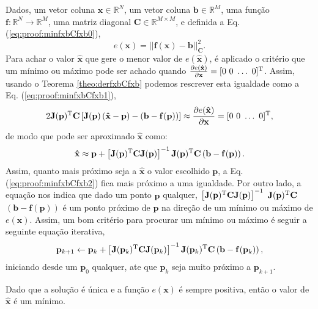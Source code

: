 \begin{myproofT}\label{proof:theo:minfxbCfxb}
Dados,
um vetor coluna $\mathbf{x}\in \mathbb{R}^N$, 
um vetor coluna $\mathbf{b}\in \mathbb{R}^M$,  
uma função $\mathbf{f}:\mathbb{R}^{N} \rightarrow \mathbb{R}^{M}$, 
uma matriz diagonal $\mathbf{C} \in \mathbb{R}^{M\times M}$, e 
definida a Eq. (\ref{eq:proof:minfxbCfxb0}),
\begin{equation}\label{eq:proof:minfxbCfxb0}
e(\mathbf{x})=||\mathbf{f}(\mathbf{x})-\mathbf{b}||_{\mathbf{C}}^2.
\end{equation}
Para achar o valor  $\mathbf{\hat{x}}$ que gere o menor valor de $e(\mathbf{\hat{x}})$, é aplicado
o critério que um mínimo ou máximo pode ser achado quando 
$\frac{\partial e(\mathbf{\hat{x}})}{\partial \mathbf{x} }=[0~ 0~ \hdots~ 0 ]^{\mathrm{T}}$.
Assim, usando o Teorema \ref{theo:derfxbCfxb} podemos 
rescrever esta igualdade como a Eq. (\ref{eq:proof:minfxbCfxb1}),
\begin{equation}\label{eq:proof:minfxbCfxb1}
2 \mathbf{J}(\mathbf{p})^{\mathrm{T}}\mathbf{C}\left[\mathbf{J}(\mathbf{p})\left(\mathbf{\hat{x}} - \mathbf{p}\right)-\left(\mathbf{b}-\mathbf{f}(\mathbf{p})\right)\right] \approx
\frac{\partial e(\mathbf{\hat{x}})}{\partial \mathbf{x} }=[0~ 0~ \hdots~ 0 ]^{\mathrm{T}},
\end{equation}
de modo que pode ser aproximado $\mathbf{\hat{x}}$ como:
\begin{equation}\label{eq:proof:minfxbCfxb2}
\mathbf{\hat{x}} \approx \mathbf{p} +
\left[ \mathbf{J}(\mathbf{p})^{\mathrm{T}}\mathbf{C} \mathbf{J}(\mathbf{p}) \right]^{-1}
\mathbf{J}(\mathbf{p})^{\mathrm{T}}\mathbf{C} \left(\mathbf{b}-\mathbf{f}(\mathbf{p})\right).
\end{equation}
Assim, quanto mais próximo seja a $\mathbf{\hat{x}}$ o valor escolhido $\mathbf{p}$, 
a Eq. (\ref{eq:proof:minfxbCfxb2}) fica mais próximo a uma igualdade. Por outro lado,
a equação nos indica que dado um ponto  $\mathbf{p}$ qualquer,
$\left[ \mathbf{J}(\mathbf{p})^{\mathrm{T}}\mathbf{C} \mathbf{J}(\mathbf{p}) \right]^{-1}$ 
$\mathbf{J}(\mathbf{p})^{\mathrm{T}}\mathbf{C}$ $\left(\mathbf{b}-\mathbf{f}(\mathbf{p})\right)$
é um ponto próximo de $\mathbf{p}$  na direção de um mínimo ou máximo de $ e(\mathbf{x})$.
Assim, um bom critério para procurar um mínimo ou máximo é seguir a seguinte 
equação iterativa,
\begin{equation}\label{eq:proof:minfxbCfxb3}
\mathbf{p}_{k+1} \leftarrow \mathbf{p}_{k} +
\left[ \mathbf{J}(\mathbf{p}_{k})^{\mathrm{T}}\mathbf{C} \mathbf{J}(\mathbf{p}_{k}) \right]^{-1}
\mathbf{J}(\mathbf{p}_{k})^{\mathrm{T}}\mathbf{C} \left(\mathbf{b}-\mathbf{f}(\mathbf{p}_{k})\right),
\end{equation}
iniciando desde um $\mathbf{p}_{0}$ qualquer, ate que $\mathbf{p}_{k}$ seja muito próximo a $\mathbf{p}_{k+1}$.

Dado que a solução é única e a função $e(\mathbf{x})$ é sempre positiva, então
o valor de $\mathbf{\hat{x}}$ é um mínimo.
\end{myproofT}